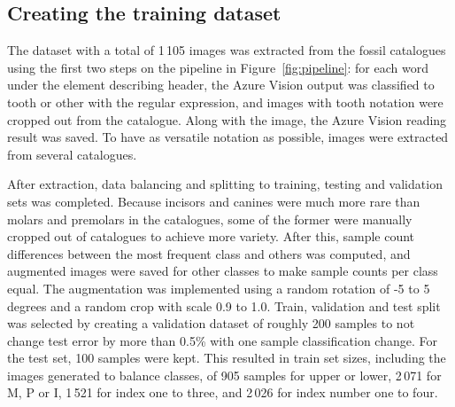 \documentclass[english,twoside,openright]{UH_DS_MSc}
\begin{document}
\subsection{Creating the training dataset}

The dataset with a total of 1\,105 images was extracted from the fossil 
catalogues using the first two steps on the pipeline in Figure~\ref{fig:pipeline}:
for each word under the element describing header, the Azure Vision output was classified 
to tooth or other with the regular expression, and 
images with tooth notation were cropped out from the catalogue. Along with the image, the 
Azure Vision \cite{azurevision} reading result was saved. To have as versatile notation as possible, images were 
extracted from several catalogues.

After extraction, data balancing and splitting to training, testing and validation sets 
was completed.
Because incisors and canines were much more rare 
than molars and premolars in the catalogues, some of the former were manually cropped out 
of catalogues to achieve more variety. After this, sample count differences 
 between the most frequent class and others was computed, and augmented 
images were saved for other classes to make sample counts per class equal. The augmentation 
was implemented using a random rotation of -5 to 5 degrees and a random crop with scale 0.9 to 1.0.
Train, validation and test split was selected by creating a validation dataset of roughly 200 samples to
 not change test error by more than 0.5\% with one sample classification
change. For the test set, 100 samples were kept. This resulted in 
train set sizes, including the images generated to balance classes, of 905 samples for upper or lower, 
2\,071 for M, P or I, 1\,521 for index one to three, and 2\,026 for index number one to four.
\end{document}
